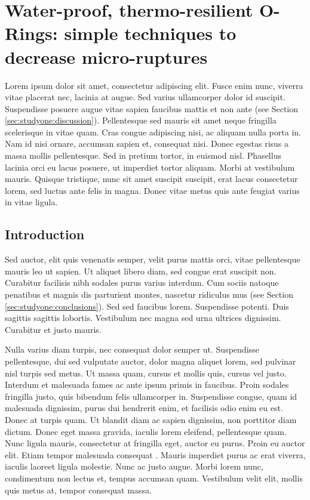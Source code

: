 \chapter[Simple techniques to decrease micro-ruptures]{Water-proof,
thermo-resilient O-Rings: simple techniques to decrease micro-ruptures}
\label{chp:studytwo}

Lorem ipsum dolor sit amet, consectetur adipiscing elit. Fusce enim nunc,
viverra vitae placerat nec, lacinia at augue.  Sed varius ullamcorper dolor
id suscipit.  Suspendisse posuere augue vitae sapien faucibus mattis et non
ante (see Section \ref{sec:studyone:discussion}).  Pellentesque sed mauris
sit amet neque fringilla scelerisque in vitae quam.  Cras congue adipiscing
nisi, ac aliquam nulla porta in.  Nam id nisi ornare, accumsan sapien et,
consequat nisi.  Donec egestas risus a massa mollis pellentesque.  Sed in
pretium tortor, in euismod nisl.  Phasellus lacinia orci eu lacus posuere,
ut imperdiet tortor aliquam.  Morbi at vestibulum mauris.  Quisque
tristique, nunc sit amet suscipit suscipit, erat lacus consectetur lorem,
sed luctus ante felis in magna.  Donec vitae metus quis ante feugiat varius
in vitae ligula.

\section{Introduction}
\label{sec:studytwo:intro}

Sed auctor, elit quis venenatis semper, velit purus mattis orci, vitae
pellentesque mauris leo ut sapien.  Ut aliquet libero diam, sed congue erat
suscipit non.  Curabitur facilisis nibh sodales purus varius interdum.  Cum
sociis natoque penatibus et magnis dis parturient montes, nascetur ridiculus
mus (see Section \ref{sec:studyone:conclusions}).  Sed sed faucibus lorem. 
Suspendisse potenti.  Duis sagittis sagittis lobortis.  Vestibulum nec magna
sed urna ultrices dignissim.  Curabitur et justo mauris.

Nulla varius diam turpis, nec consequat dolor semper ut. Suspendisse
pellentesque, dui sed vulputate auctor, dolor magna aliquet lorem, sed
pulvinar nisl turpis sed metus.  Ut massa quam, cursus et mollis quis,
cursus vel justo.  Interdum et malesuada fames ac ante ipsum primis in
faucibus.  Proin sodales fringilla justo, quis bibendum felis ullamcorper
in.  Suspendisse congue, quam id malesuada dignissim, purus dui hendrerit
enim, et facilisis odio enim eu est.  Donec at turpis quam.  Ut blandit diam
ac sapien dignissim, non porttitor diam dictum.  Donec eget massa gravida,
iaculis lorem eleifend, pellentesque quam.  Nunc ligula mauris, consectetur
at fringilla eget, auctor eu purus.  Proin eu auctor elit.  Etiam tempor
malesuada consequat \cite{Morgan2002}.  Mauris imperdiet purus ac erat
viverra, iaculis laoreet ligula molestie.  Nunc ac justo augue.  Morbi lorem
nunc, condimentum non lectus et, tempus accumsan quam.  Vestibulum velit
elit, mollis quis metus at, tempor consequat massa.

